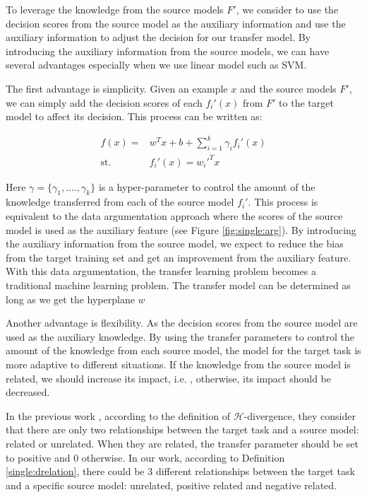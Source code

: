 To leverage the knowledge from the source models $F'$, we consider to use the decision scores from the source model as the auxiliary information and use the auxiliary information to adjust the decision for our transfer model. 
By introducing the auxiliary information from the source models, we can have several advantages especially when we use linear model such as SVM.

The first advantage is simplicity. Given an example $x$ and the source models $F'$, we can simply add the decision scores of each $f_i'(x)$ from $F'$ to the target model to affect its decision. This process can be written as:

\begin{equation}\label{eq:single:linear}
\begin{aligned}
f(x) = & w^Tx+b+\sum_{i=1}^{k}\gamma_i f_i'(x) \\
\text{st.} \qquad & f_i'(x) = w_i'^Tx
\end{aligned}
\end{equation}

Here $\gamma=\{\gamma_1,....,\gamma_k\}$ is a hyper-parameter to control the amount of the knowledge transferred from each of the source model $f_i'$. This process is equivalent to the data argumentation approach where the scores of the source model is used as the auxiliary feature (see Figure \ref{fig:single:arg}). 
By introducing the auxiliary information from the source model, we expect to reduce the bias from the target training set and get an improvement from the auxiliary feature. With this data argumentation, the transfer learning problem becomes a traditional machine learning problem. The transfer model can be determined as long as we get the hyperplane $w$
 
Another advantage is flexibility. As the decision scores from the source model are used as the auxiliary knowledge. By using the transfer parameters to control the amount of the knowledge from each source model, the model for the target task is more adaptive to different situations. If the knowledge from the source model is related, we should increase its impact, i.e. , otherwise, its impact should be decreased. 

In the previous work \cite{kuzborskij2013n} \cite{tommasi2014learning}, according to the definition of $\mathcal{H}$-divergence, they consider that there are only two relationships between the target task and a source model: related or unrelated. When they are related, the transfer parameter should be set to positive and 0 otherwise. In our work, according to Definition \ref{single:drelation}, there could be 3 different relationships between the target task and a specific source model: unrelated, positive related and negative related. 

